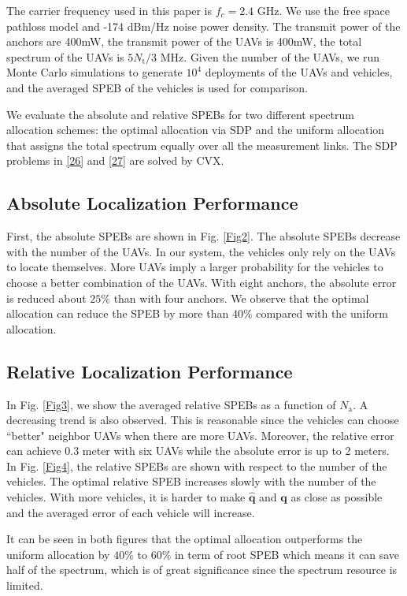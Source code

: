 \documentclass{IEEEtran}
\begin{document}
The carrier frequency used in this paper is $f_c=2.4$ GHz. We use the free space pathloss model and -174 dBm/Hz noise power density.
The transmit power of the anchors are 400mW, the transmit power of the UAVs is 400mW, the total spectrum of the UAVs  is $5N_{\text{t}}/3$ MHz. Given the number of the UAVs, we run Monte Carlo simulations to generate $10^4$ deployments of the UAVs and vehicles, and the averaged SPEB of the vehicles is used for comparison.

We evaluate the absolute and relative SPEBs for two different spectrum allocation schemes: the optimal allocation via SDP and the uniform allocation that assigns the total spectrum equally over all the measurement links. The SDP problems in \eqref{26} and \eqref{27} are solved by CVX.
\subsection{Absolute Localization Performance}
First, the absolute SPEBs are shown in Fig. \ref{Fig2}. The absolute SPEBs decrease with the number of the UAVs. In our system, the vehicles only rely on the UAVs to locate themselves. More UAVs imply a larger probability for the vehicles to choose a better combination of the UAVs. With eight anchors, the absolute error is reduced about $25\%$ than with four anchors. We observe that the optimal allocation can reduce the SPEB by more than $40\%$ compared with the uniform allocation.
\subsection{Relative Localization Performance}
In Fig. \ref{Fig3}, we show the averaged relative SPEBs as a function of $N_{\text{a}}$. A decreasing trend is also observed. This is reasonable since the vehicles can choose ``better" neighbor UAVs when there are more UAVs. Moreover, the relative error can achieve 0.3 meter with six UAVs while the absolute error is up to 2 meters. In Fig. \ref{Fig4}, the relative SPEBs are shown with respect to the number of the vehicles. The optimal relative SPEB increases slowly with the number of the vehicles. With more vehicles, it is harder to make $\hat{\mathbf{q}}$ and $\mathbf{q}$ as close as possible and the averaged error of each vehicle will increase.

It can be seen in both figures that the optimal allocation outperforms the uniform allocation by $40\%$ to $60\%$ in term of root SPEB which means it can save half of the spectrum, which is of great significance since the spectrum resource is limited.
\end{document}
